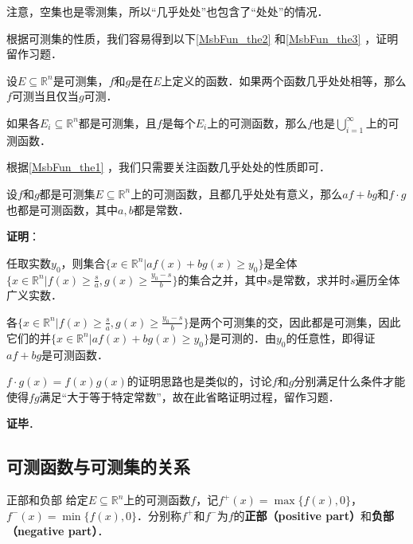 注意，空集也是零测集，所以“几乎处处”也包含了“处处”的情况．

根据可测集的性质，我们容易得到以下\autoref{MsbFun_the2} 和\autoref{MsbFun_the3} ，证明留作习题．

\begin{theorem}{}\label{MsbFun_the2}
设$E\subseteq\mathbb{R}^n$是可测集，$f$和$g$是在$E$上定义的函数．如果两个函数几乎处处相等，那么$f$可测当且仅当$g$可测．
\end{theorem}



\begin{theorem}{}\label{MsbFun_the3}
如果各$E_i\subseteq\mathbb{R}^n$都是可测集，且$f$是每个$E_i$上的可测函数，那么$f$也是$\bigcup_{i=1}^\infty$上的可测函数．
\end{theorem}

根据\autoref{MsbFun_the1} ，我们只需要关注函数几乎处处的性质即可．

\begin{theorem}{}
设$f$和$g$都是可测集$E\subseteq\mathbb{R}^n$上的可测函数，且都几乎处处有意义，那么$af+bg$和$f\cdot g$也都是可测函数，其中$a, b$都是常数．
\end{theorem}

\textbf{证明}：

任取实数$y_0$，则集合$\{x\in\mathbb{R}^n|af(x)+bg(x)\geq y_0\}$是全体$\{x\in\mathbb{R}^n|f(x)\geq \frac{s}{a}, g(x)\geq \frac{y_0-s}{b}\}$的集合之并，其中$s$是常数，求并时$s$遍历全体广义实数．

各$\{x\in\mathbb{R}^n|f(x)\geq \frac{s}{a}, g(x)\geq \frac{y_0-s}{b}\}$是两个可测集的交，因此都是可测集，因此它们的并$\{x\in\mathbb{R}^n|af(x)+bg(x)\geq y_0\}$是可测的．由$y_0$的任意性，即得证$af+bg$是可测函数．

$f\cdot g(x)=f(x)g(x)$的证明思路也是类似的，讨论$f$和$g$分别满足什么条件才能使得$fg$满足“大于等于特定常数”，故在此省略证明过程，留作习题．


\textbf{证毕}．




\subsection{可测函数与可测集的关系}




\begin{definition}{正部和负部}
给定$E\subseteq\mathbb{R}^n$上的可测函数$f$，记$f^+(x)=\max\{f(x), 0\}$，$f^-(x)=\min\{f(x), 0\}$．分别称$f^+$和$f^-$为$f$的\textbf{正部（positive part）}和\textbf{负部（negative part）}．
\end{definition}

